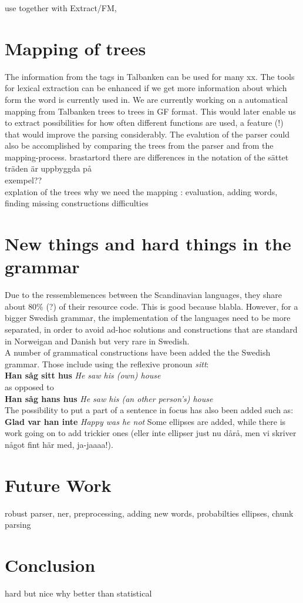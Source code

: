 \documentclass[submission,copyright,creativecommons]{eptcs} %
\begin{document}
use together with Extract/FM,

\section{Mapping of trees}
The information from the tags in Talbanken can be used for many xx.
The tools for lexical extraction can be enhanced if we get more information
about which form the word is currently used in. 
We are currently working on a automatical mapping from Talbanken trees to trees in GF format.
This would later enable us to extract possibilities for how often different functions
are used, a feature (!) that would improve the parsing considerably.
The evalution of the parser could also be accomplished by comparing the trees
from the parser and from the mapping-process.
brastartord there are differences in the notation of the sättet träden är uppbyggda på \\
 exempel?? \\ 

explation of the trees
why we need the mapping : evaluation, adding words, finding missing constructions
difficulties

\section{New things and hard things in the grammar}
Due to the ressemblemences between the Scandinavian languages, they share about 80\% (?)
of their resource code. This is good because blabla.
However, for a bigger Swedish grammar, the implementation of the languages need to be more separated,
in order to avoid ad-hoc solutions and constructions that are standard in
Norweigan and Danish but very rare in Swedish. \\ %
A number of grammatical constructions have been added the the Swedish grammar.
Those include using the reflexive pronoun \emph{sitt}:\\
\textbf{Han såg sitt hus} \emph{He saw his (own) house} \\
as opposed to \\
\textbf{Han såg hans hus} \emph{He saw his (an other person's) house} \\
The possibility to put a part of a sentence in focus has also been added such as:\\
\textbf{Glad var han inte} \emph{Happy was he not}
Some ellipses are added, while there is work going on to add trickier ones (eller inte 
ellipser just nu dårå, men vi skriver något fint här med, ja-jaaaa!).


\section{Future Work}
robust parser, ner, preprocessing, adding new words,
probabilties
ellipses, chunk parsing 


\section{Conclusion}
hard but nice
why better than statistical


\nocite{*}


\end{document}
